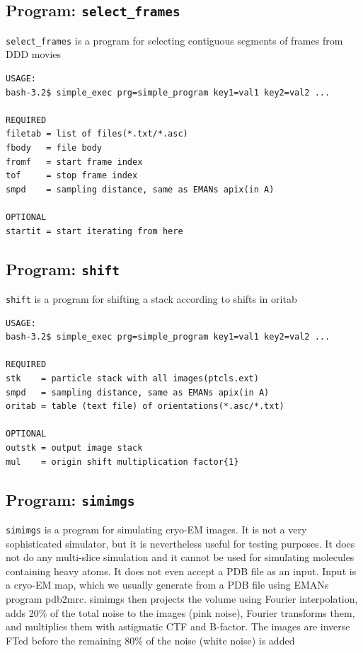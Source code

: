 \documentclass[a4paper,11pt]{article}
\newcommand{\prgname}[1]{\textcolor{NavyBlue}{\texttt{#1}}}
\begin{document}
\subsection{Program: \prgname{select\_frames}}
\label{select_frames}
\prgname{select\_frames} is a program for selecting contiguous segments of frames from DDD movies 

\begin{verbatim}
USAGE:
bash-3.2$ simple_exec prg=simple_program key1=val1 key2=val2 ...

REQUIRED
filetab = list of files(*.txt/*.asc)
fbody   = file body
fromf   = start frame index
tof     = stop frame index
smpd    = sampling distance, same as EMANs apix(in A)

OPTIONAL
startit = start iterating from here
\end{verbatim}

\subsection{Program: \prgname{shift}}
\label{shift}
\prgname{shift} is a program for shifting a stack according to shifts in oritab

\begin{verbatim}
USAGE:
bash-3.2$ simple_exec prg=simple_program key1=val1 key2=val2 ...

REQUIRED
stk    = particle stack with all images(ptcls.ext)
smpd   = sampling distance, same as EMANs apix(in A)
oritab = table (text file) of orientations(*.asc/*.txt)

OPTIONAL
outstk = output image stack
mul    = origin shift multiplication factor{1}
\end{verbatim}

\subsection{Program: \prgname{simimgs}}
\label{simimgs}
\prgname{simimgs} is a program for simulating cryo-EM images. It is not a very sophisticated simulator, but it is nevertheless useful for testing purposes. It does not do any multi-slice simulation and it cannot be used for simulating molecules containing heavy atoms. It does not even accept a PDB file as an input. Input is a cryo-EM map, which we usually generate from a PDB file using EMANs program pdb2mrc. simimgs then projects the volume using Fourier interpolation, adds 20\% of the total noise to the images (pink noise), Fourier transforms them, and multiplies them with astigmatic CTF and B-factor. The images are inverse FTed before the remaining 80\% of the noise (white noise) is added
\end{document}

